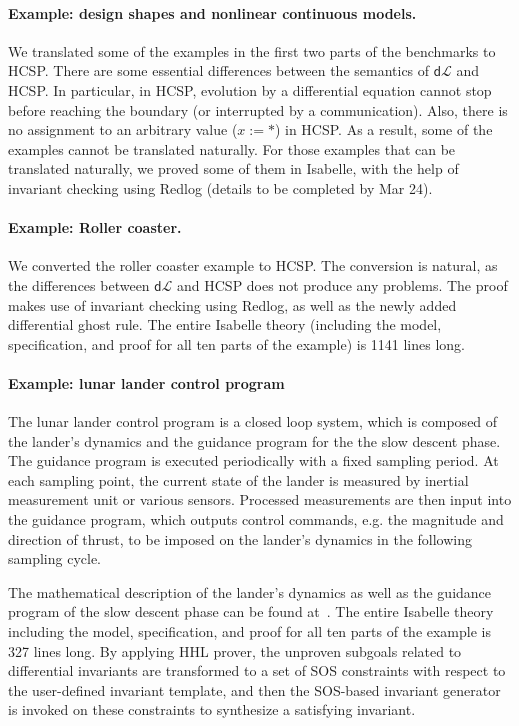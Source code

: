\documentclass[runningheads,a4paper]{llncs}
\newcommand{\dL}{\mathsf{d}\mathcal{L}}
\begin{document}
\paragraph{Example: design shapes and nonlinear continuous models.}

We translated some of the examples in the first two parts of the
benchmarks to HCSP. There are some essential differences between the
semantics of $\dL$ and HCSP. In particular, in HCSP, evolution by a
differential equation cannot stop before reaching the boundary (or
interrupted by a communication). Also, there is no assignment to an
arbitrary value ($x := *$) in HCSP. As a result, some of the examples
cannot be translated naturally. For those examples that can be
translated naturally, we proved some of them in Isabelle, with the
help of invariant checking using Redlog (details to be completed by
Mar 24).

\paragraph{Example: Roller coaster.}

We converted the roller coaster example \cite{coasterx} to HCSP. The
conversion is natural, as the differences between $\dL$ and HCSP does
not produce any problems. The proof makes use of invariant checking
using Redlog, as well as the newly added differential ghost rule. The
entire Isabelle theory (including the model, specification, and proof
for all ten parts of the example) is 1141 lines long.

\paragraph{Example: lunar lander control program}
The lunar lander control program is a closed loop system, which is composed of the lander's dynamics and the guidance program for the the slow descent phase. The guidance program is executed periodically with a fixed sampling period. At each sampling point, the current state of the lander is measured by inertial measurement unit or various sensors. Processed measurements are then input into the guidance program, which outputs control commands, e.g. the magnitude and direction of thrust, to be imposed on the lander's dynamics in the following sampling cycle.

The mathematical description of the lander's dynamics as well as the guidance program of the slow descent phase can be found at~\cite{ZYZG14,ZhanWZ16}.  The entire Isabelle theory including the model, specification, and proof for all ten parts of the example is 327 lines long.  By applying HHL prover, the unproven subgoals related to differential invariants are transformed to a set of SOS constraints with respect to the user-defined invariant template, and then the SOS-based invariant generator is invoked on these constraints to synthesize a satisfying invariant.





\end{document}
